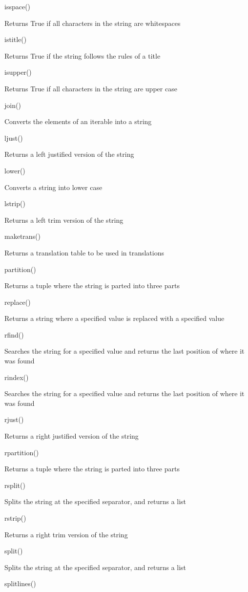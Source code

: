 \documentclass[
  letterpaper,
  DIV=11,
  numbers=noendperiod]{scrreprt}
\begin{document}
isspace()

Returns True if all characters in the string are whitespaces

istitle()

Returns True if the string follows the rules of a title

isupper()

Returns True if all characters in the string are upper case

join()

Converts the elements of an iterable into a string

ljust()

Returns a left justified version of the string

lower()

Converts a string into lower case

lstrip()

Returns a left trim version of the string

maketrans()

Returns a translation table to be used in translations

partition()

Returns a tuple where the string is parted into three parts

replace()

Returns a string where a specified value is replaced with a specified
value

rfind()

Searches the string for a specified value and returns the last position
of where it was found

rindex()

Searches the string for a specified value and returns the last position
of where it was found

rjust()

Returns a right justified version of the string

rpartition()

Returns a tuple where the string is parted into three parts

rsplit()

Splits the string at the specified separator, and returns a list

rstrip()

Returns a right trim version of the string

split()

Splits the string at the specified separator, and returns a list

splitlines()
\end{document}
